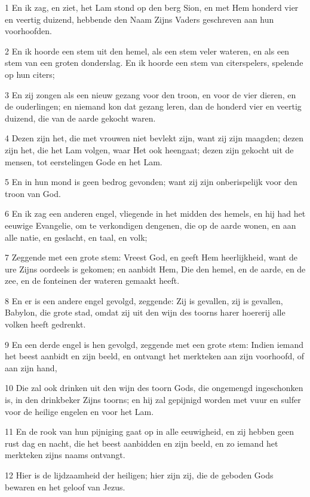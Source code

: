\par 1 En ik zag, en ziet, het Lam stond op den berg Sion, en met Hem honderd vier en veertig duizend, hebbende den Naam Zijns Vaders geschreven aan hun voorhoofden.
\par 2 En ik hoorde een stem uit den hemel, als een stem veler wateren, en als een stem van een groten donderslag. En ik hoorde een stem van citerspelers, spelende op hun citers;
\par 3 En zij zongen als een nieuw gezang voor den troon, en voor de vier dieren, en de ouderlingen; en niemand kon dat gezang leren, dan de honderd vier en veertig duizend, die van de aarde gekocht waren.
\par 4 Dezen zijn het, die met vrouwen niet bevlekt zijn, want zij zijn maagden; dezen zijn het, die het Lam volgen, waar Het ook heengaat; dezen zijn gekocht uit de mensen, tot eerstelingen Gode en het Lam.
\par 5 En in hun mond is geen bedrog gevonden; want zij zijn onberispelijk voor den troon van God.
\par 6 En ik zag een anderen engel, vliegende in het midden des hemels, en hij had het eeuwige Evangelie, om te verkondigen dengenen, die op de aarde wonen, en aan alle natie, en geslacht, en taal, en volk;
\par 7 Zeggende met een grote stem: Vreest God, en geeft Hem heerlijkheid, want de ure Zijns oordeels is gekomen; en aanbidt Hem, Die den hemel, en de aarde, en de zee, en de fonteinen der wateren gemaakt heeft.
\par 8 En er is een andere engel gevolgd, zeggende: Zij is gevallen, zij is gevallen, Babylon, die grote stad, omdat zij uit den wijn des toorns harer hoererij alle volken heeft gedrenkt.
\par 9 En een derde engel is hen gevolgd, zeggende met een grote stem: Indien iemand het beest aanbidt en zijn beeld, en ontvangt het merkteken aan zijn voorhoofd, of aan zijn hand,
\par 10 Die zal ook drinken uit den wijn des toorn Gods, die ongemengd ingeschonken is, in den drinkbeker Zijns toorns; en hij zal gepijnigd worden met vuur en sulfer voor de heilige engelen en voor het Lam.
\par 11 En de rook van hun pijniging gaat op in alle eeuwigheid, en zij hebben geen rust dag en nacht, die het beest aanbidden en zijn beeld, en zo iemand het merkteken zijns naams ontvangt.
\par 12 Hier is de lijdzaamheid der heiligen; hier zijn zij, die de geboden Gods bewaren en het geloof van Jezus.
